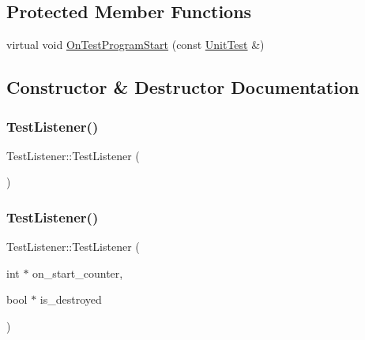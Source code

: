 \subsection*{Protected Member Functions}
\begin{DoxyCompactItemize}
\item 
virtual void \hyperlink{class_test_listener_a6218f522f5b6b37050ff0ea630ac5fd3}{On\+Test\+Program\+Start} (const \hyperlink{classtesting_1_1_unit_test}{Unit\+Test} \&)
\end{DoxyCompactItemize}


\subsection{Constructor \& Destructor Documentation}
\mbox{\label{class_test_listener_ae20c874ce92777371de6d024df229e9f}} 
\subsubsection{\texorpdfstring{Test\+Listener()}{TestListener()}\hspace{0.1cm}{\footnotesize\ttfamily [1/2]}}
{\footnotesize\ttfamily Test\+Listener\+::\+Test\+Listener (\begin{DoxyParamCaption}{ }\end{DoxyParamCaption})\hspace{0.3cm}{\ttfamily [inline]}}

\mbox{\label{class_test_listener_ab65604c6c3742c494e9378e770da5d42}} 
\subsubsection{\texorpdfstring{Test\+Listener()}{TestListener()}\hspace{0.1cm}{\footnotesize\ttfamily [2/2]}}
{\footnotesize\ttfamily Test\+Listener\+::\+Test\+Listener (\begin{DoxyParamCaption}\item[{int $\ast$}]{on\+\_\+start\+\_\+counter,  }\item[{bool $\ast$}]{is\+\_\+destroyed }\end{DoxyParamCaption})\hspace{0.3cm}{\ttfamily [inline]}}

